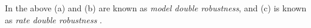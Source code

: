 \documentclass[11pt]{article}
\newcommand{\eqnn}{\begin{eqnarray*}}
\begin{document}
In the above (a) and (b) are known as {\it model double robustness}, and (c) is known as {\it rate double robustness} \citep{smucler2019unifying,hou2019estimating}.
\end{document}
